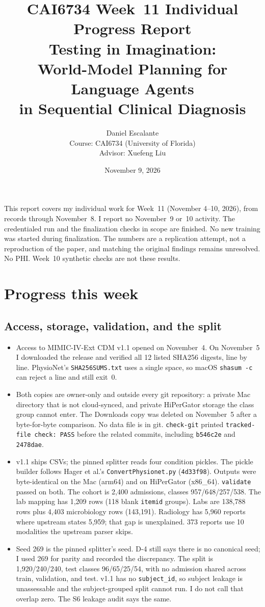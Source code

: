 \documentclass[11pt,letterpaper]{article}
\title{\textbf{CAI6734 Week~11 Individual Progress Report}\\[0.35em]
\large Testing in Imagination:\\
World-Model Planning for Language Agents\\
in Sequential Clinical Diagnosis}
\author{Daniel Escalante\\[0.4em]
\small Course: CAI6734 (University of Florida)\\
Advisor: Xuefeng Liu}
\date{November 9, 2026}
\begin{document}
\maketitle
\thispagestyle{empty}

\noindent
This report covers my individual work for Week~11 (November 4--10, 2026), from records through November~8. I report no November~9 or~10 activity. The credentialed run and the finalization checks in scope are finished. No new training was started during finalization. The numbers are a replication attempt, not a reproduction of the paper, and matching the original findings remains unresolved. No PHI. Week~10 synthetic checks are not these results.

\section{Progress this week}

\subsection{Access, storage, validation, and the split}
\begin{itemize}
  \item Access to MIMIC-IV-Ext CDM v1.1 opened on November~4. On November~5 I downloaded the release and verified all 12 listed SHA256 digests, line by line. PhysioNet's \texttt{SHA256SUMS.txt} uses a single space, so macOS \texttt{shasum -c} can reject a line and still exit~0.
  \item Both copies are owner-only and outside every git repository: a private Mac directory that is not cloud-synced, and private HiPerGator storage the class group cannot enter. The Downloads copy was deleted on November~5 after a byte-for-byte comparison. No data file is in git. \texttt{check-git} printed \texttt{tracked-file check: PASS} before the related commits, including \texttt{b546c2e} and \texttt{2478dae}.
  \item v1.1 ships CSVs; the pinned splitter reads four condition pickles. The pickle builder follows Hager et al.'s \texttt{ConvertPhysionet.py} (\texttt{4d33f98}). Outputs were byte-identical on the Mac (arm64) and on HiPerGator (x86\_64). \texttt{validate} passed on both. The cohort is 2,400 admissions, classes 957/648/257/538. The lab mapping has 1,209 rows (118 blank \texttt{itemid} groups). Labs are 138,788 rows plus 4,403 microbiology rows (143,191). Radiology has 5,960 reports where upstream states 5,959; that gap is unexplained. 373 reports use 10 modalities the upstream parser skips.
  \item Seed 269 is the pinned splitter's seed. D-4 still says there is no canonical seed; I used 269 for parity and recorded the discrepancy. The split is 1,920/240/240, test classes 96/65/25/54, with no admission shared across train, validation, and test. v1.1 has no \texttt{subject\_id}, so subject leakage is unassessable and the subject-grouped split cannot run. I do not call that overlap zero. The S6 leakage audit says the same.
\end{itemize}
\end{document}
